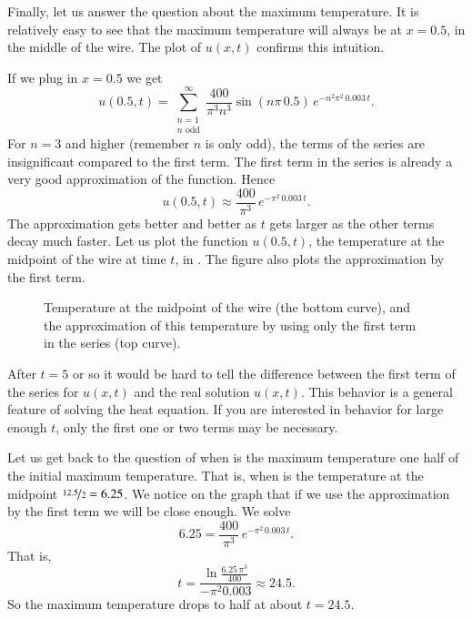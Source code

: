 \begin{example}
Finally, let us answer the question about the maximum temperature.  It is
relatively easy to see
that the maximum temperature will always be at $x=0.5$, in
the middle of the wire.  The plot of $u(x,t)$ confirms this intuition.

If we plug in $x=0.5$ we get
\begin{equation*}
u(0.5,t) = 
\sum_{\substack{n=1 \\ n \text{ odd}}}^\infty
\frac{400}{\pi^3 n^3}
\sin (n \pi\, 0.5 )
\, e^{-n^2 \pi^2 \, 0.003 \, t} .
\end{equation*}
For $n=3$ and higher (remember $n$ is only odd), the terms
of the series
are insignificant compared to the first term.
The first term in the series is already a very good approximation
of the function.  
Hence 
\begin{equation*}
u(0.5,t) \approx
\frac{400}{\pi^3}
\, e^{-\pi^2 \, 0.003 \, t} .
\end{equation*}
The approximation gets better and better as $t$ gets larger as the other
terms decay much faster.
Let us plot the function $u(0.5,t)$, the temperature at the midpoint of the wire
at time $t$, in .  The figure also
plots the approximation by the first term.

\begin{figure}[h!t]
\capstart
\begin{center}
\caption{Temperature at the midpoint of the wire (the bottom curve),
and the approximation of this temperature by using only the first term in
the series (top curve).\label{heat:wireexmaxfig}}
\end{center}
\end{figure}

After $t=5$ or so
it would be hard to tell the difference
between the first term of the series for $u(x,t)$ and 
the real solution $u(x,t)$.  This behavior
is a general feature of solving the heat equation.
If you are interested in behavior for large enough $t$, only the
first one or two terms may be necessary.

Let us
get back to the question of when is the maximum temperature one half of the
initial maximum temperature.  That is, when is the temperature
at the midpoint $\nicefrac{12.5}{2} = 6.25$.  We notice on the graph that if we use
the approximation by the first term we will be close enough.  We
solve
\begin{equation*}
6.25 =
\frac{400}{\pi^3}
\, e^{-\pi^2 \, 0.003 \, t} .
\end{equation*}
That is,
\begin{equation*}
t =
\frac{\ln \frac{6.25\,\pi^3}{400}}{-\pi^2 0.003}
\approx 24.5 .
\end{equation*}
So the maximum temperature drops to half at about $t=24.5$.
\end{example}

